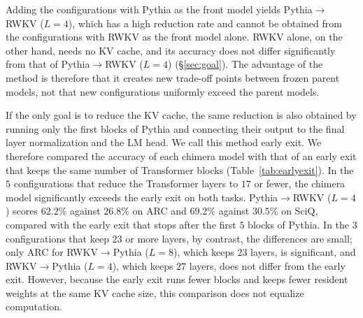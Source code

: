\documentclass[conference]{IEEEtran}
\newcommand{\tabref}[1]{Table~\ref{#1}}
\newcommand{\RtoP}{RWKV$\to$\allowbreak Pythia}
\newcommand{\PtoR}{Pythia$\to$\allowbreak RWKV}
\newcommand{\RtoPL}[1]{\RtoP{} ($L{=}#1$)}
\newcommand{\PtoRL}[1]{\PtoR{} ($L{=}#1$)}
\begin{document}
Adding the configurations with Pythia as the front model yields \PtoRL{4}, which has a high reduction rate and cannot be obtained from
the configurations with RWKV as the front model alone.
RWKV alone, on the other hand, needs no KV cache, and its accuracy
does not differ significantly from that of \PtoRL{4} (\S\ref{sec:goal}). The advantage of the method is therefore that it creates new trade-off points between
frozen parent models, not that new configurations uniformly exceed the parent models.

If the only goal is to reduce the KV cache, the same reduction is also obtained by running only the first blocks of Pythia and
connecting their output to the final layer normalization and the LM head. We call this method early exit. We therefore compared the accuracy of each chimera model with that of an early exit
that keeps the same number of Transformer blocks (\tabref{tab:earlyexit}). In the $5$ configurations that reduce the Transformer
layers to $17$ or fewer, the chimera model significantly exceeds the early exit on both tasks. \PtoRL{4} scores $62.2\%$ against
$26.8\%$ on ARC and $69.2\%$ against $30.5\%$ on SciQ, compared with the early exit that stops after the first $5$ blocks of Pythia.
In the $3$ configurations that keep $23$ or more layers, by contrast, the differences are small; only ARC for \RtoPL{8}, which keeps
$23$ layers, is significant, and \RtoPL{4}, which keeps $27$ layers, does not differ from the early exit.
However, because the early exit runs fewer blocks and keeps fewer resident weights at the same KV cache size, this comparison
does not equalize computation.
\end{document}
